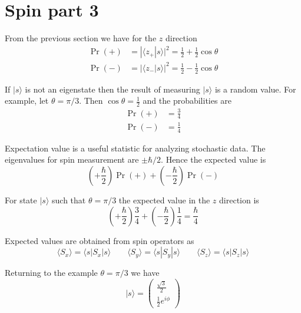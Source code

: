 

\section*{Spin part 3}

From the previous section we have for the $z$ direction
\begin{align*}
\Pr(+)&=|\langle z_+|s\rangle|^2=\tfrac{1}{2}+\tfrac{1}{2}\cos\theta
\\[1ex]
\Pr(-)&=|\langle z_-|s\rangle|^2=\tfrac{1}{2}-\tfrac{1}{2}\cos\theta
\end{align*}

If $|s\rangle$ is not an eigenstate then the result
of measuring $|s\rangle$ is a random value.
For example, let $\theta=\pi/3$.
Then $\cos\theta=\frac{1}{2}$ and the probabilities are
\begin{align*}
\Pr(+)&=\tfrac{3}{4}
\\[1ex]
\Pr(-)&=\tfrac{1}{4}
\end{align*}

Expectation value is a useful statistic for analyzing stochastic data.
The eigenvalues for spin measurement are $\pm\hbar/2$.
Hence the expected value is
\begin{equation*}
\left(+\frac{\hbar}{2}\right)\Pr(+)+\left(-\frac{\hbar}{2}\right)\Pr(-)
\end{equation*}

For state $|s\rangle$ such that $\theta=\pi/3$ the expected value in the $z$ direction is
\begin{equation*}
\left(+\frac{\hbar}{2}\right)\frac{3}{4}+\left(-\frac{\hbar}{2}\right)\frac{1}{4}=\frac{\hbar}{4}
\end{equation*}

Expected values are obtained from spin operators as
\begin{equation*}
\langle S_x\rangle=\langle s|S_x|s\rangle\qquad
\langle S_y\rangle=\langle s|S_y|s\rangle\qquad
\langle S_z\rangle=\langle s|S_z|s\rangle
\end{equation*}

Returning to the example $\theta=\pi/3$ we have
\begin{equation*}
|s\rangle=\begin{pmatrix}\frac{\sqrt3}{2}\\[1ex]\frac{1}{2}e^{i\phi}\end{pmatrix}
\end{equation*}

